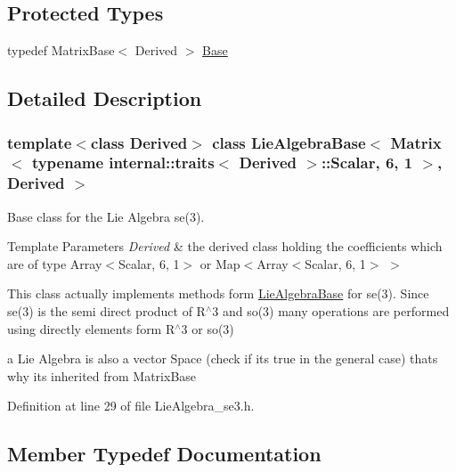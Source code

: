 \subsection*{Protected Types}
\begin{DoxyCompactItemize}
\item 
typedef Matrix\+Base$<$ Derived $>$ \hyperlink{class_lie_algebra_base_3_01_matrix_3_01typename_01internal_1_1traits_3_01_derived_01_4_1_1_scala449314c781550590437697c4dc21a6d4_a0ab68a3ff4a7f5f7b3682db1dde89651}{Base}
\end{DoxyCompactItemize}


\subsection{Detailed Description}
\subsubsection*{template$<$class Derived$>$\newline
class Lie\+Algebra\+Base$<$ Matrix$<$ typename internal\+::traits$<$ Derived $>$\+::\+Scalar, 6, 1 $>$, Derived $>$}

Base class for the Lie Algebra se(3). 


\begin{DoxyTemplParams}{Template Parameters}
{\em Derived} & the derived class holding the coefficients which are of type Array$<$\+Scalar, 6, 1$>$ or Map$<$Array$<$\+Scalar, 6, 1$>$ $>$\\
\hline
\end{DoxyTemplParams}
This class actually implements methods form \hyperlink{class_lie_algebra_base}{Lie\+Algebra\+Base} for se(3). Since se(3) is the semi direct product of R$^\wedge$3 and so(3) many operations are performed using directly elements form R$^\wedge$3 or so(3)

a Lie Algebra is also a vector Space (check if it\textquotesingle{}s true in the general case) that\textquotesingle{}s why it\textquotesingle{}s inherited from Matrix\+Base 

Definition at line 29 of file Lie\+Algebra\+\_\+se3.\+h.



\subsection{Member Typedef Documentation}
\hypertarget{class_lie_algebra_base_3_01_matrix_3_01typename_01internal_1_1traits_3_01_derived_01_4_1_1_scala449314c781550590437697c4dc21a6d4_abdcc3b581461214bd08505af9fbd25d8}{}\label{class_lie_algebra_base_3_01_matrix_3_01typename_01internal_1_1traits_3_01_derived_01_4_1_1_scala449314c781550590437697c4dc21a6d4_abdcc3b581461214bd08505af9fbd25d8} 
